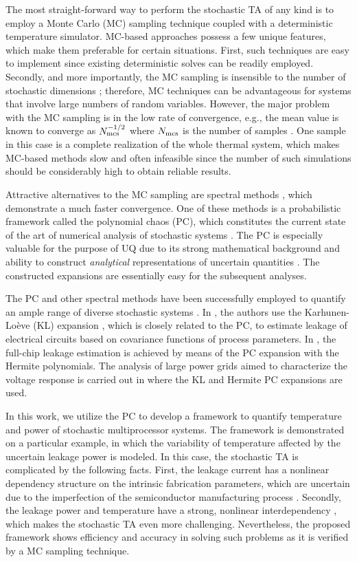 The most straight-forward way to perform the stochastic TA of any kind is to employ a Monte Carlo (MC) sampling technique coupled with a deterministic temperature simulator. MC-based approaches possess a few unique features, which make them preferable for certain situations. First, such techniques are easy to implement since existing deterministic solves can be readily employed. Secondly, and more importantly, the MC sampling is insensible to the number of stochastic dimensions \cite{maitre2010}; therefore, MC techniques can be advantageous for systems that involve large numbers of random variables. However, the major problem with the MC sampling is in the low rate of convergence, e.g., the mean value is known to converge as $N_\text{mcs}^{-{{1}/{2}}}$ where $N_\text{mcs}$ is the number of samples \cite{xiu2009, maitre2010}. One sample in this case is a complete realization of the whole thermal system, which makes MC-based methods slow and often infeasible since the number of such simulations should be considerably high to obtain reliable results.

Attractive alternatives to the MC sampling are spectral methods \cite{maitre2010}, which demonstrate a much faster convergence. One of these methods is a probabilistic framework called the polynomial chaos (PC), which constitutes the current state of the art of numerical analysis of stochastic systems \cite{xiu2009}. The PC is especially valuable for the purpose of UQ due to its strong mathematical background and ability to construct \emph{analytical} representations of uncertain quantities \cite{eldred2009}. The constructed expansions are essentially easy for the subsequent analyses.

The PC and other spectral methods have been successfully employed to quantify an ample range of diverse stochastic systems \cite{xiu2010}. In \cite{bhardwaj2006}, the authors use the Karhunen-Lo\`{e}ve (KL) expansion \cite{loeve1978}, which is closely related to the PC, to estimate leakage of electrical circuits based on covariance functions of process parameters. In \cite{shen2009}, the full-chip leakage estimation is achieved by means of the PC expansion with the Hermite polynomials. The analysis of large power grids aimed to characterize the voltage response is carried out in \cite{ghanta2006} where the KL and Hermite PC expansions are used.

In this work, we utilize the PC to develop a framework to quantify temperature and power of stochastic multiprocessor systems. The framework is demonstrated on a particular example, in which the variability of temperature affected by the uncertain leakage power is modeled. In this case, the stochastic TA is complicated by the following facts. First, the leakage current has a nonlinear dependency structure on the intrinsic fabrication parameters, which are uncertain due to the imperfection of the semiconductor manufacturing process \cite{juan2011, juan2012, srivastava2010}. Secondly, the leakage power and temperature have a strong, nonlinear interdependency \cite{liu2007}, which makes the stochastic TA even more challenging. Nevertheless, the proposed framework shows efficiency and accuracy in solving such problems as it is verified by a MC sampling technique.


